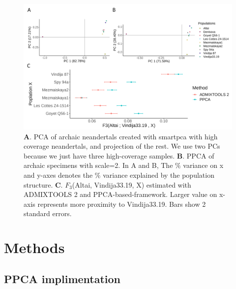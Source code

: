 \documentclass[12pt]{article}
\begin{document}
\begin{figure}[ht!]
    \includegraphics[width=16.5cm]{Images/Figures/nea_main.png}
    \centering
    \caption{\textbf{A}. PCA of archaic neandertals created with smartpca with high coverage neandertals, and projection of the rest. We use  two PCs because we just have three high-coverage samples.
    \textbf{B}. PPCA of archaic specimens with scale=2. In A and B, The $\%$ variance on x and y-axes denotes the $\%$ variance explained by the population structure. \textbf{C}. $F_3$(Altai, Vindija33.19, X) estimated with ADMIXTOOLS 2 and PPCA-based-framework. Larger value on x-axis represents more proximity to Vindija33.19. Bars show 2 standard errors.}
    \label{fig:nea_f3}
\end{figure}


\section{Methods}\label{ch2_methods}

\subsection{PPCA implimentation}\label{method-ppca}
\end{document}
